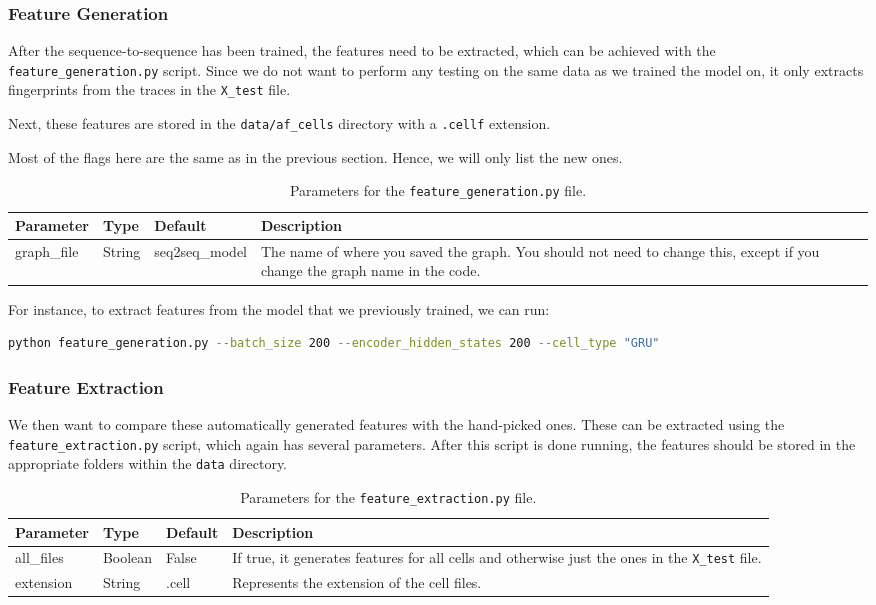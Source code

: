 \subsubsection{Feature Generation}

After the sequence-to-sequence has been trained, the features need to be extracted, which can be achieved with the \texttt{feature\_generation.py} script.
Since we do not want to perform any testing on the same data as we trained the model on, it only extracts fingerprints from the traces in the \texttt{X\_test} file.

Next, these features are stored in the \texttt{data/af\_cells} directory with a \texttt{.cellf} extension.

Most of the flags here are the same as in the previous section.
Hence, we will only list the new ones.

\newpage

\begin{table}[ht]
  \centering
  \begin{tabular}{ l | l | l | p{} }
    \textbf{Parameter} & \textbf{Type} & \textbf{Default} & \textbf{Description} \\ \hline \hline
    graph\_file & String & seq2seq\_model & The name of where you saved the graph. You should not need to change this, except if you change the graph name in the code.
  \end{tabular}
  \caption{Parameters for the \texttt{feature\_generation.py} file.}
\end{table}

\noindent
For instance, to extract features from the model that we previously trained, we can run:
\begin{lstlisting}[language=Bash]
python feature_generation.py --batch_size 200 --encoder_hidden_states 200 --cell_type "GRU"
\end{lstlisting}

\subsubsection{Feature Extraction}

We then want to compare these automatically generated features with the hand-picked ones.
These can be extracted using the \texttt{feature\_extraction.py} script, which again has several parameters.
After this script is done running, the features should be stored in the appropriate folders within the \texttt{data} directory.

\begin{table}[ht]
  \centering
  \begin{tabular}{ l | l | l | p{} }
    \textbf{Parameter} & \textbf{Type} & \textbf{Default} & \textbf{Description} \\ \hline \hline
    all\_files & Boolean & False & If true, it generates features for all cells and otherwise just the ones in the \texttt{X\_test} file. \\ \hline
    extension & String & .cell & Represents the extension of the cell files.
  \end{tabular}
  \caption{Parameters for the \texttt{feature\_extraction.py} file.}
\end{table}

